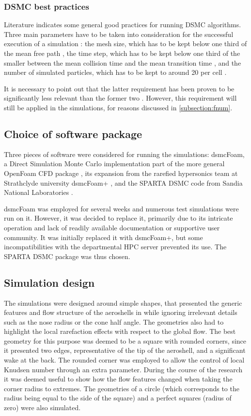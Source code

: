 \subsubsection{DSMC best practices}
\label{subsection:bestpractices}
Literature indicates some general good practices for running DSMC algorithms. Three main parameters have to be taken into consideration for the successful execution of a simulation \cite{purdue}: the mesh size, which has to be kept below one third of the mean free path \cite{purdue, fnum1}, the time step, which has to be kept below one third of the smaller between the mean collision time and the mean transition time \cite{purdue}, and the number of simulated particles, which has to be kept to around 20 per cell \cite{purdue}. 

It is necessary to point out that the latter requirement has been proven to be significantly less relevant than the former two \cite{fnum1, fnum2}. However, this requirement will still be applied in the simulations, for reasons discussed in \autoref{subsection:fnum}.

\subsection{Choice of software package}
Three pieces of software were considered for running the simulations: dsmcFoam, a Direct Simulation Monte Carlo implementation part of the more general OpenFoam CFD package \cite{openfoam}, its expansion from the rarefied hypersonics team at Strathclyde university dsmcFoam+ \cite{dsmcfoam+}, and the SPARTA DSMC code from Sandia National Laboratories \cite{sparta}.

dsmcFoam was employed for several weeks and numerous test simulations were run on it. However, it was decided to replace it, primarily due to its intricate operation and lack of readily available documentation or supportive user community. It was initially replaced it with dsmcFoam+, but some incompatibilities with the departmental HPC server prevented its use. The SPARTA DSMC package was thus chosen.

\subsection{Simulation design}
The simulations were designed around simple shapes, that presented the generic features  and flow structure of the aeroshells in \cite{hathoraero1} while ignoring irrelevant details such as the nose radius or the cone half angle. The geometries also had to highlight the local rarefaction effects with respect to the global flow. The best geometry for this purpose was deemed to be a square with rounded corners, since it presented two edges, representative of the tip of the aeroshell, and a significant wake at the back. The rounded corner was employed to allow the control of local Knudsen number through an extra parameter. During the course of the research it was deemed useful to show how the flow features changed when taking the corner radius to extremes. The geometries of a circle (which corresponds to the radius being equal to the side of the square) and a perfect squares (radius of zero) were also simulated.

